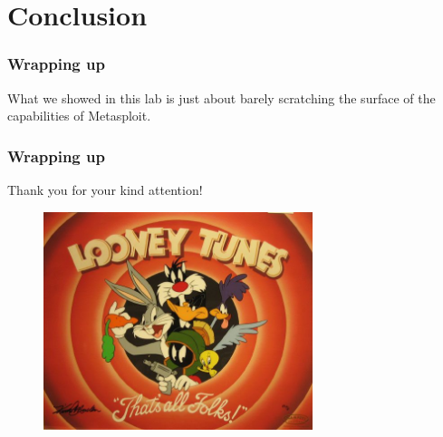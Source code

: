 \documentclass[handout]{beamer}
\begin{document}
\section{Conclusion}

\begin{frame}
    \frametitle{Wrapping up}
     {
        What we showed in this lab is just about barely scratching the surface of the capabilities of Metasploit.
    }
    
    \medskip
    
\end{frame}

\begin{frame}
    \frametitle{Wrapping up}
    Thank you for your kind attention!
            
    \begin{figure}
        \centering
        \includegraphics[width=0.7\textwidth]{../drawable/decorations/image-thatsall.jpg}
    \end{figure}
\end{frame}


\end{document}
